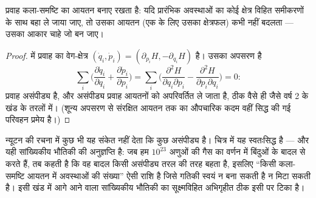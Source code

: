 \begin{theorem}[ल्यूविल की प्रमेय]\label{thm:b3:hamiltonian-mechanics:liouville}
 प्रवाह कला-समष्टि का आयतन बनाए रखता है: यदि प्रारंभिक
अवस्थाओं का कोई क्षेत्र विहित समीकरणों के साथ बहा ले जाया जाए, तो उसका
आयतन (एक  के लिए उसका क्षेत्रफल) कभी नहीं बदलता ---
उसका आकार चाहे जो बन जाए।
\end{theorem}

\begin{proof}
 में प्रवाह का वेग-क्षेत्र $(\dot q_i, \dot p_i) =
(\partial_{p_i}H, -\partial_{q_i}H)$ है। उसका अपसरण है
\[
\sum_i\Big(\frac{\partial\dot q_i}{\partial q_i}
 + \frac{\partial\dot p_i}{\partial p_i}\Big)
 = \sum_i\Big(\frac{\partial^2H}{\partial q_i\partial p_i}
 - \frac{\partial^2H}{\partial p_i\partial q_i}\Big) = 0 :
\]
प्रवाह असंपीड्य है, और असंपीड्य प्रवाह आयतनों को अपरिवर्तित ले जाता है,
ठीक वैसे ही जैसे वर्ष 2 के खंड के तरलों में। (शून्य अपसरण से संरक्षित
आयतन तक का औपचारिक कदम वहीं सिद्ध की गई परिवहन प्रमेय है।)
\end{proof}

\begin{remark}[ल्यूविल क्यों महत्वपूर्ण है]\label{rem:b3:hamiltonian-mechanics:liouville-matters}
न्यूटन की रचना में कुछ भी यह संकेत नहीं देता कि कुछ असंपीड्य है।
 चित्र में यह स्वतःसिद्ध है --- और यही सांख्यिकीय भौतिकी की
अनुज्ञप्ति है: जब हम
$10^{23}$ अणुओं की गैस का वर्णन  में बिंदुओं के बादल से करते
हैं, तब  कहती है कि वह बादल किसी असंपीड्य तरल की तरह
बहता है, इसलिए ``किसी कला-समष्टि आयतन में अवस्थाओं की संख्या'' ऐसी राशि
है जिसे गतिकी स्वयं न बना सकती है न मिटा सकती है। इसी खंड में आगे आने
वाला सांख्यिकीय भौतिकी का सूक्ष्मविहित अभिगृहीत ठीक इसी पर टिका है।
\end{remark}

